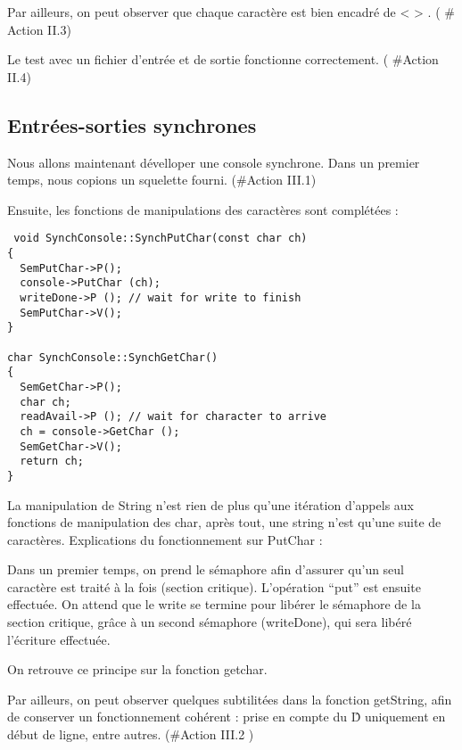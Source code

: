 \documentclass[a4paper,10pt]{article}
\begin{document}
Par ailleurs, on peut observer que chaque caractère est bien encadré de < > . ( \# Action II.3)

Le test avec un fichier d'entrée et de sortie fonctionne correctement. ( \#Action II.4)
\newpage
\subsection{Entrées-sorties synchrones}
Nous allons maintenant dévelloper une console synchrone. Dans un premier temps, nous copions un squelette fourni. (\#Action III.1)

Ensuite, les fonctions de manipulations des caractères sont complétées :
\begin{verbatim}
 void SynchConsole::SynchPutChar(const char ch)
{
  SemPutChar->P();
  console->PutChar (ch);
  writeDone->P (); // wait for write to finish
  SemPutChar->V();
}

char SynchConsole::SynchGetChar()
{
  SemGetChar->P();
  char ch;
  readAvail->P (); // wait for character to arrive
  ch = console->GetChar ();
  SemGetChar->V();
  return ch;
}

\end{verbatim}

La manipulation de String n'est rien de plus qu'une itération d'appels aux fonctions de manipulation des char,
après tout, une string n'est qu'une suite de caractères.
Explications du fonctionnement sur PutChar :

Dans un premier temps, on prend le sémaphore afin d'assurer qu'un seul caractère est traité à la fois (section critique).
L'opération ``put'' est ensuite effectuée. On attend que le write se termine pour libérer le sémaphore de la section critique,
grâce à un second sémaphore (writeDone), qui sera libéré l'écriture effectuée.

On retrouve ce principe sur la fonction getchar.

Par ailleurs, on peut observer quelques subtilitées dans la fonction getString, afin de conserver un fonctionnement cohérent :
prise en compte du \^D uniquement en début de ligne, entre autres. (\#Action III.2 )
\end{document}
